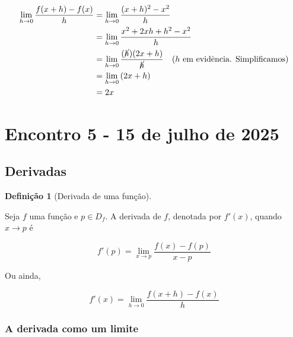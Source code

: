 \documentclass[12pt,openright,twoside,a4paper]{article}
\theoremstyle{definition}
\newtheorem{definition}{Definição}[section]
\begin{document}
	\begin{align*}
		\lim_{h \to 0} \dfrac{f(x+h) - f(x)}{h} &= \lim_{h \to 0} \dfrac{(x+h)^2 - x^2}{h} \\
		&= \lim_{h \to 0} \dfrac{x^2 + 2xh + h^2 - x^2}{h} \\
		&= \lim_{h \to 0} \dfrac{(\cancel{h})(2x + h)}{\cancel{h}} \quad \text{($h$ em evidência. Simplificamos)}\\
		&= \lim_{h \to 0} \left(2x + h\right) \\
		&= 2x
	\end{align*}
	
	\pagebreak
	\section{Encontro 5 - 15 de julho de 2025}
	
	\subsection{Derivadas}
	
	\begin{definition}[Derivada de uma função]\label{def:derivada}
		
		Seja $f$ uma função e $p \in D_f$. A derivada de $f$, denotada por $f'(x)$, quando $x \to p$ é
		
		\begin{equation}
			\boxed{f'(p) = \lim_{x \to p} \dfrac{f(x) - f(p)}{x-p}}
		\end{equation}
		
		Ou ainda,
		
		\begin{equation}
			\boxed{f'(x) = \lim_{h \to 0}  \dfrac{f(x + h) - f(x)}{h}} 
		\end{equation}
		
		
	\end{definition}
	
	\subsubsection{A derivada como um limite}
	
\end{document}
